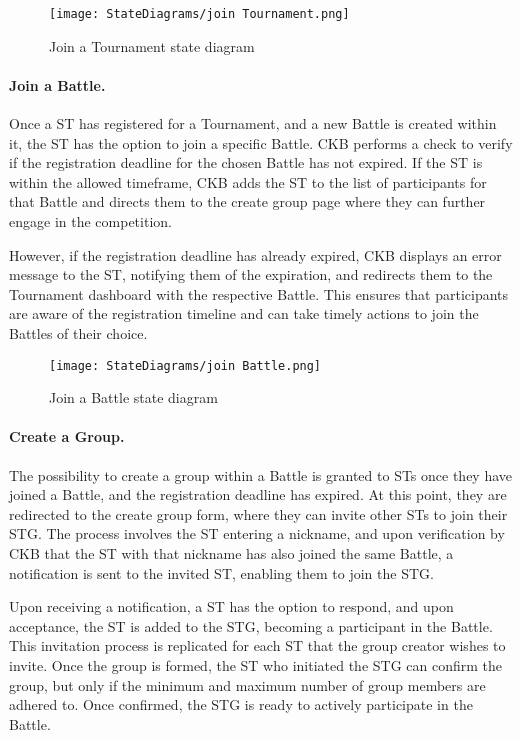 \begin{figure}[H]
    \begin{center}
        \texttt{[image: StateDiagrams/join Tournament.png]}
        \caption{Join a Tournament state diagram}
        \label{fig:join_Tournament_sd}%
    \end{center}
\end{figure}

\paragraph{Join a Battle.}
Once a ST has registered for a Tournament, and a new Battle is created within it, the ST has the option to join a specific Battle. CKB performs a check to verify if the registration deadline for the chosen Battle has not expired. If the ST is within the allowed timeframe, CKB adds the ST to the list of participants for that Battle and directs them to the create group page where they can further engage in the competition.

However, if the registration deadline has already expired, CKB displays an error message to the ST, notifying them of the expiration, and redirects them to the Tournament dashboard with the respective Battle. This ensures that participants are aware of the registration timeline and can take timely actions to join the Battles of their choice.

\begin{figure}[H]
    \begin{center}
        \texttt{[image: StateDiagrams/join Battle.png]}
        \caption{Join a Battle state diagram}
        \label{fig:join_Battle_sd}%
    \end{center}
\end{figure}

\paragraph{Create a Group.}
The possibility to create a group within a Battle is granted to STs once they have joined a Battle, and the registration deadline has expired. At this point, they are redirected to the create group form, where they can invite other STs to join their STG. The process involves the ST entering a nickname, and upon verification by CKB that the ST with that nickname has also joined the same Battle, a notification is sent to the invited ST, enabling them to join the STG.

Upon receiving a notification, a ST has the option to respond, and upon acceptance, the ST is added to the STG, becoming a participant in the Battle. This invitation process is replicated for each ST that the group creator wishes to invite. Once the group is formed, the ST who initiated the STG can confirm the group, but only if the minimum and maximum number of group members are adhered to. Once confirmed, the STG is ready to actively participate in the Battle.

